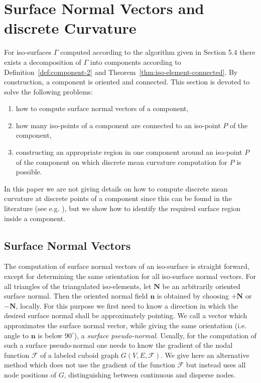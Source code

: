 \documentclass[a4paper,11pt]{article}
\begin{document}
\section{Surface Normal Vectors and discrete Curvature}
For iso-surfaces $\Gamma$ computed according to the algorithm given in Section 5.4 there exists
a decomposition of $\Gamma$ into components according to Definition~\ref{def:component-2} and
Theorem~\ref{thm:iso-element-connected}. By construction, a component is oriented and connected.
This section is devoted to solve the following problems:
\begin{enumerate}
\item how to compute surface normal vectors of a component,
\item how many iso-points of a component are connected to an iso-point $P$ of the component,
\item constructing an appropriate region in one component around an iso-point $P$ of the component
on which discrete mean curvature computation for $P$ is possible.
\end{enumerate}
In this paper we are not giving details on how to compute discrete mean curvature at discrete points of
a component since this can be found in the literature (see e.g. \cite{Meyer02Vismath}), but we
show how to identify the required surface region inside a component.

\subsection{Surface Normal Vectors}
The computation of surface normal vectors of an iso-surface is straight forward, except for
determining the same orientation for all iso-surface normal vectors. For all triangles of the triangulated
iso-elements, let $\pmb{N}$ be an arbitrarily oriented surface normal. Then the oriented normal field
$\pmb{n}$ is obtained by choosing $+\pmb{N}$ or $-\pmb{N}$, locally. For this purpose we first
need to know a direction in which the desired surface normal shall be approximately pointing. We call
a vector which approximates the surface normal vector, while giving the same orientation (i.e. angle to
$\pmb{n}$ is below $90^{\circ}$), a {\it surface pseudo-normal}. Usually, for the computation of such a
surface pseudo-normal one needs to know the gradient of the nodal function $\mathcal{F}$ of a labeled
cuboid graph $G(V,E,\mathcal{F})$. We give here an alternative method which does not use the gradient
of the function $\mathcal{F}$ but instead uses all node positions of $G$, distinguishing between continuous
and disperse nodes.
\end{document}
